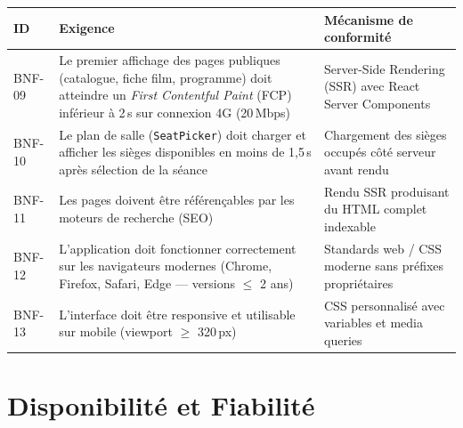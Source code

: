 \documentclass[12pt,a4paper,openany]{report}
\begin{document}
\begin{longtable}{p{1.2cm}p{8cm}p{3.5cm}}
  \toprule
  \textbf{ID} & \textbf{Exigence} & \textbf{Mécanisme de conformité} \\
  \midrule
  \endhead
  \bottomrule
  \endfoot

  BNF-09 & Le premier affichage des pages publiques (catalogue, fiche film, programme) doit atteindre un \textit{First Contentful Paint} (FCP) inférieur à 2\,s sur connexion 4G (20\,Mbps) & Server-Side Rendering (SSR) avec React Server Components \\[4pt]

  BNF-10 & Le plan de salle (\texttt{SeatPicker}) doit charger et afficher les sièges disponibles en moins de 1,5\,s après sélection de la séance & Chargement des sièges occupés côté serveur avant rendu \\[4pt]

  BNF-11 & Les pages doivent être référençables par les moteurs de recherche (SEO) & Rendu SSR produisant du HTML complet indexable \\[4pt]

  BNF-12 & L'application doit fonctionner correctement sur les navigateurs modernes (Chrome, Firefox, Safari, Edge — versions $\leq$ 2 ans) & Standards web / CSS moderne sans préfixes propriétaires \\[4pt]

  BNF-13 & L'interface doit être responsive et utilisable sur mobile (viewport $\geq$ 320\,px) & CSS personnalisé avec variables et media queries \\
\end{longtable}

\section{Disponibilité et Fiabilité}
\end{document}
